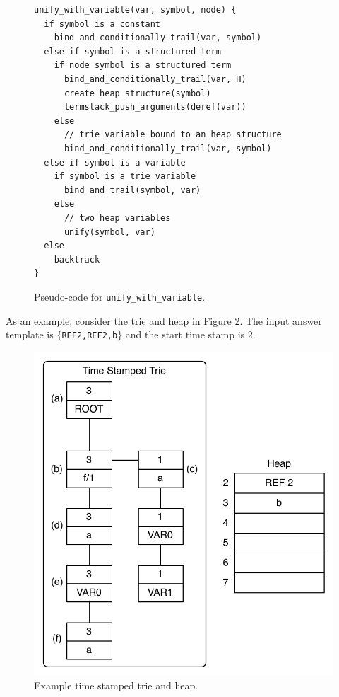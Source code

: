 \begin{figure}[H]
\begin{Verbatim}[fontsize=\small]
unify_with_variable(var, symbol, node) {
  if symbol is a constant
    bind_and_conditionally_trail(var, symbol)
  else if symbol is a structured term
    if node symbol is a structured term
      bind_and_conditionally_trail(var, H)
      create_heap_structure(symbol)
      termstack_push_arguments(deref(var))
    else
      // trie variable bound to an heap structure
      bind_and_conditionally_trail(var, symbol)
  else if symbol is a variable
    if symbol is a trie variable
      bind_and_trail(symbol, var)
    else
      // two heap variables
      unify(symbol, var)
  else
    backtrack
}
\end{Verbatim}
\caption{Pseudo-code for \texttt{unify\_with\_variable}.}
\label{fig:unify_with_variable}
\end{figure}

As an example, consider the trie and heap in Figure \ref{fig:collect_variable}.
The input answer template is $\{$\texttt{REF2,REF2,b}$\}$ and the start time stamp is 2.

\begin{figure}[H]
  \centering
    \includegraphics[scale=0.6]{collect_variable.pdf}
  \caption{Example time stamped trie and heap.}
  \label{fig:collect_variable}
\end{figure}

